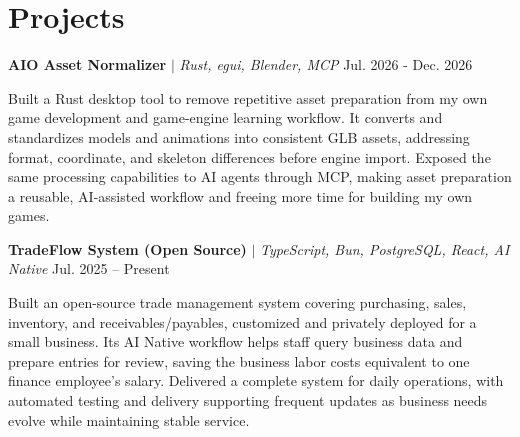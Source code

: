 
\section{Projects}
\resumeSubHeadingListStart
\resumeProjectHeading
{\textbf{AIO Asset Normalizer} $|$ \emph{Rust, egui, Blender, MCP}}
{Jul. 2026 - Dec. 2026}
{\small
  Built a Rust desktop tool to remove repetitive asset preparation from my own game development and game-engine learning workflow. It converts and standardizes models and animations into consistent GLB assets, addressing format, coordinate, and skeleton differences before engine import. Exposed the same processing capabilities to AI agents through MCP, making asset preparation a reusable, AI-assisted workflow and freeing more time for building my own games.
  \par
}
\resumeProjectHeading
{\textbf{TradeFlow System (Open Source)} $|$ \emph{TypeScript, Bun, PostgreSQL, React, AI Native}}
{Jul. 2025 -- Present}
{\small
  Built an open-source trade management system covering purchasing, sales, inventory,
  and receivables/payables, customized and privately deployed for a small business.
  Its AI Native workflow helps staff query business data and prepare entries for review,
  saving the business labor costs equivalent to one finance employee's salary.
  Delivered a complete system for daily operations, with automated testing and delivery
  supporting frequent updates as business needs evolve while maintaining stable service.
  \par
}
\resumeSubHeadingListEnd
